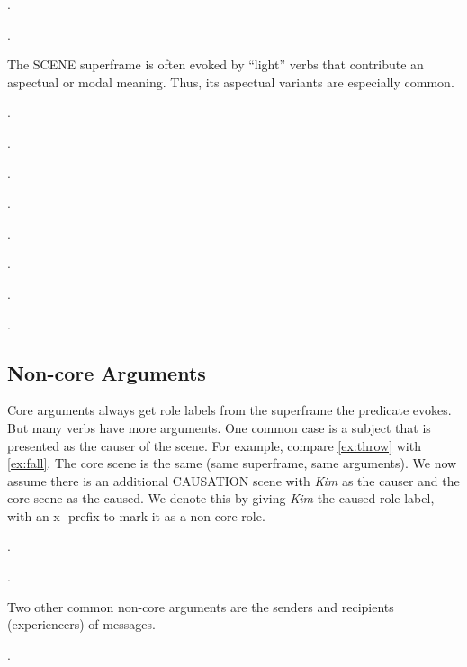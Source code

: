\documentclass[a4paper]{article}
\newcommand{\fr}[1]{\textsf{#1}}
\newcommand{\rl}[1]{\textsf{#1}}
\begin{document}
\ex.

\ex.

The \fr{SCENE} superframe is often evoked by ``light'' verbs that contribute an aspectual or modal meaning. Thus, its aspectual variants are especially common.

\ex.

\ex.

\ex.

\ex.

\ex.

\ex.

\ex.

\ex.

\subsection{Non-core Arguments}

Core arguments always get role labels from the superframe the predicate evokes.
But many verbs have more arguments. One common case is a subject that is
presented as the causer of the scene. For example, compare \ref{ex:throw} with
\ref{ex:fall}. The core scene is the same (same superframe, same arguments). We
now assume there is an additional \fr{CAUSATION} scene with \emph{Kim} as the
\rl{causer} and the core scene as the \rl{caused}. We denote this by giving
\emph{Kim} the \rl{caused} role label, with an \rl{x-} prefix to mark it as a
non-core role.

\ex.\label{ex:throw}

\ex.

Two other common non-core arguments are the senders and recipients (experiencers) of messages.

\ex.
\end{document}
